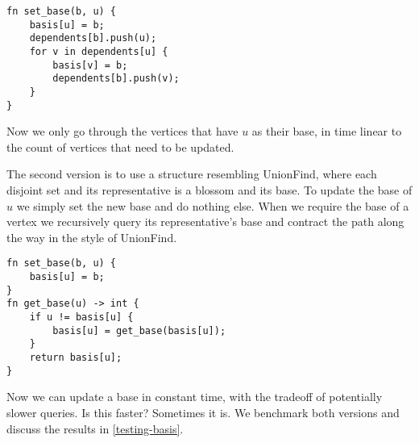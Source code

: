 \begin{lstlisting}[caption={Observer basis},label=Listing,mathescape=true]
fn set_base(b, u) {
    basis[u] = b;
    dependents[b].push(u);
    for v in dependents[u] {
        basis[v] = b;
        dependents[b].push(v);
    }
}
\end{lstlisting}

Now we only go through the vertices that have $u$ as their base, in time linear to the count of vertices that need to be updated.

The second version is to use a structure resembling UnionFind, where each disjoint set and its representative is a blossom and its base. To update the base of $u$ we simply set the new base and do nothing else. When we require the base of a vertex we recursively query its representative's base and contract the path along the way in the style of UnionFind. 

\begin{lstlisting}[caption={UF-like basis},label=Listing,mathescape=true]
fn set_base(b, u) {
    basis[u] = b;
}
fn get_base(u) -> int {
    if u != basis[u] {
        basis[u] = get_base(basis[u]);
    }
    return basis[u];
}

\end{lstlisting}

Now we can update a base in constant time, with the tradeoff of potentially slower queries. Is this faster? Sometimes it is. We benchmark both versions and discuss the results in \ref{testing-basis}.

